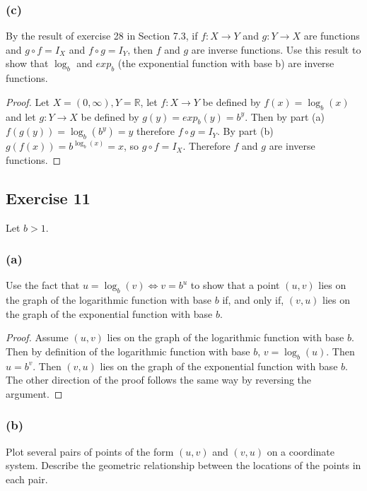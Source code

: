 \documentclass[14pt]{extarticle}
\newcommand{\R}{\mathbb{R}}
\begin{document}
\subsubsection{(c)}
By the result of exercise 28 in Section 7.3, if \(f: X \to Y\) and \(g: Y \to X\) are functions and \(g \circ f = I_X\) and 
\(f \circ g = I_Y\), then \(f\) and \(g\) are inverse functions. Use this result to show that \(\log_b\) and 
\(exp_b\) (the exponential function with base b) are inverse functions.

\begin{proof}
Let \(X = (0, \infty), Y = \R\), let \(f: X \to Y\) be defined by \(f(x) = \log_b(x)\) and let \(g: Y \to X\) be defined by 
\(g(y) = exp_b(y) = b^y\). Then by part (a) \(f(g(y)) = \log_b(b^y) = y\) therefore \(f \circ g = I_Y\). By part (b)
\(g(f(x)) = b^{\log_b(x)} = x\), so \(g \circ f = I_X\). Therefore \(f\) and \(g\) are inverse functions.
\end{proof}

\subsection{Exercise 11}
Let \(b > 1\).

\subsubsection{(a)}
Use the fact that \(u = \log_b(v) \iff v = b^u\) to show that a point \((u, v)\) lies on the graph of the logarithmic 
function with base \(b\) if, and only if, \((v, u)\) lies on the graph of the exponential function with base \(b\).

\begin{proof}
Assume \((u, v)\) lies on the graph of the logarithmic 
function with base \(b\). Then by definition of the 
logarithmic function with base \(b\), \(v = \log_b(u)\). Then \(u = b^v\). Then \((v, u)\) lies on the graph of the 
exponential function with base \(b\). The other direction of the proof follows the same way by reversing the argument.
\end{proof}

\subsubsection{(b)}
Plot several pairs of points of the form \((u, v)\) and \((v, u)\) on a coordinate system. Describe the geometric 
relationship between the locations of the points in each pair.
\end{document}
